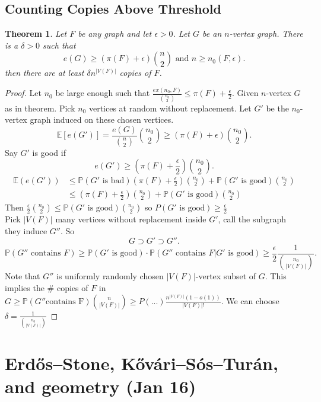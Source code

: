 \documentclass[a4paper]{article}
\newtheorem{thm}{Theorem}[section]
\begin{document}
\subsection{Counting Copies Above Threshold}

\begin{thm}
    Let $F$ be any graph and let $\epsilon>0$. Let $G$ be an $n$-vertex graph. There is a $\delta>0$ such that \[
    e(G)\geq \left( \pi(F)+\epsilon \right) {n\choose 2} \text{ and } n\geq n_0(F,\epsilon)
    .\]
    then there are at least $\delta n^{|V(F)|}$ copies of $F$.
\end{thm}
\begin{proof}
        Let $n_0$ be large enough such that $\frac{ex(n_0,F)}{{n_0 \choose 2}}\leq \pi(F)+\frac{\epsilon}{2}.$ Given $n$-vertex $G$ as in theorem. Pick $n_0$ vertices at random without replacement. Let $G'$ be the $n_0$-vertex graph induced on these chosen vertices. \[
        \mathbb{E}[e(G')]=\frac{e(G)}{{n \choose 2}}{n_0 \choose 2}\geq (\pi(F)+\epsilon){n_0 \choose 2}
        .\] 
        Say $G'$ is good if \[
        e(G')\geq \left(\pi(F)+\frac{\epsilon}{2}  \right){n_0 \choose 2}
        .\] 
        \begin{align*}
            \mathbb{E}(e(G'))&\leq \mathbb{P}(G' \text{ is bad})\left (\pi(F)+\frac{\epsilon}{2}\right ){n_0 \choose 2}+\mathbb{P}(G' \text{ is good}){n_0 \choose 2}\\
            &\leq \left(\pi(F)+\frac{\epsilon}{2}\right ){n_0 \choose 2}+\mathbb{P}(G' \text{ is good}) {n_0 \choose 2}
        \end{align*}
        Then $\frac{\epsilon}{2}{n_0 \choose 2}\leq \mathbb{P}(G' \text{ is good}) {n_0 \choose 2}$ so $P(G' \text{ is good})\geq \frac{\epsilon}{2}$\\
        Pick $|V(F)|$ many vertices without replacement inside $G'$, call the subgraph they induce $G''$. So \[
        G\supset G' \supset G''
        .\]
        \[
        \mathbb{P}(G'' \text{ contains } F)\geq \mathbb{P}(G' \text{ is good})\cdot \mathbb{P}(G'' \text{ contains $F$} | G' \text{ is good})\geq \frac{\epsilon}{2}\frac{1}{{n_0 \choose |V(F)|}}
        .\] 
        Note that $G''$ is uniformly randomly chosen $|V(F)|$-vertex subset of $G.$ This implies the \# copies of $F$ in $G\geq \mathbb{P}(G'' \text{contains F}){n \choose |V(F)|}\geq P(...)\frac{n^{|V(F)|}(1-o(1))}{|V(F)|!}.$ We can choose $\delta=\frac{1}{{n_0 \choose |V(F)|}}$
\end{proof}
\newpage
\section{Erd\H{o}s--Stone, K\H{o}v\'ari--S\'os--Tur\'an, and geometry (Jan 16)}
\end{document}
